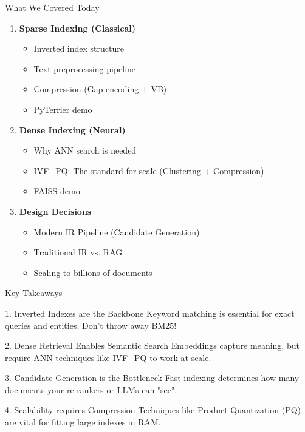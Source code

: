 \documentclass[aspectratio=169]{beamer}
\begin{document}
\begin{frame}[shrink=5]{What We Covered Today}
\begin{enumerate}
    \item \textbf{Sparse Indexing (Classical)}
    \begin{itemize}
        \item Inverted index structure
        \item Text preprocessing pipeline
        \item Compression (Gap encoding + VB)
        \item PyTerrier demo
    \end{itemize}
    
    \item \textbf{Dense Indexing (Neural)}
    \begin{itemize}
        \item Why ANN search is needed
        \item IVF+PQ: The standard for scale (Clustering + Compression)
        \item FAISS demo
    \end{itemize}
    
    \item \textbf{Design Decisions}
    \begin{itemize}
        \item Modern IR Pipeline (Candidate Generation)
        \item Traditional IR vs. RAG
        \item Scaling to billions of documents
    \end{itemize}
\end{enumerate}
\end{frame}

\begin{frame}[shrink=5]{Key Takeaways}
\begin{block}{1. Inverted Indexes are the Backbone}
Keyword matching is essential for exact queries and entities. Don't throw away BM25!
\end{block}

\begin{block}{2. Dense Retrieval Enables Semantic Search}
Embeddings capture meaning, but require ANN techniques like IVF+PQ to work at scale.
\end{block}

\begin{block}{3. Candidate Generation is the Bottleneck}
Fast indexing determines how many documents your re-rankers or LLMs can "see".
\end{block}

\begin{block}{4. Scalability requires Compression}
Techniques like Product Quantization (PQ) are vital for fitting large indexes in RAM.
\end{block}
\end{frame}
\end{document}
